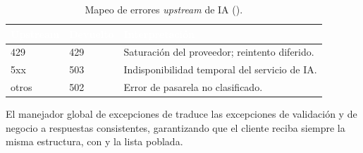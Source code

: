 \begin{table}[!ht]
    \centering
    \renewcommand{\arraystretch}{1.3}
    \fontsize{9}{10.8}\selectfont\sffamily
    \begin{tabularx}{\textwidth}{|l|l|X|}
        \hline
        \rowcolor{colorPrimario}
        \textcolor{white}{\textbf{Upstream}} & \textcolor{white}{\textbf{Devuelto}} & \textcolor{white}{\textbf{Interpretación}} \\ \hline
        429 & 429 & Saturación del proveedor; reintento diferido. \\ \hline
        \rowcolor{grisTecnico}
        5xx & 503 & Indisponibilidad temporal del servicio de IA. \\ \hline
        otros & 502 & Error de pasarela no clasificado. \\ \hline
    \end{tabularx}
    \caption{Mapeo de errores \textit{upstream} de IA ().}
    \label{tab:anexo_err_ia}
\end{table}

\clearpage
\begin{NotaTecnica}
El manejador global de excepciones de  traduce las excepciones de validación y
de negocio a respuestas  consistentes, garantizando que el cliente reciba
siempre la misma estructura, con  y la lista  poblada.
\end{NotaTecnica}

\clearpage
